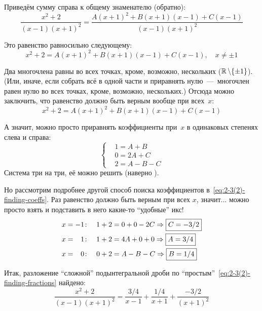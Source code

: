 \documentclass[a4paper,12pt]{article}
\begin{document}
\begin{solution}
    Приведём сумму справа к общему знаменателю (обратно):
    \[
      \frac{x^2 + 2}{(x - 1) (x + 1)^2} = \frac{A(x + 1)^2 + B(x + 1)(x - 1) + C(x - 1)}{(x - 1) (x + 1)^2}
    \]

    Это равенство равносильно следующему:
    \[
      x^2 + 2 = A(x + 1)^2 + B(x + 1)(x - 1) + C(x - 1),\quad x \not= \pm 1
    \]

    Два многочлена равны во всех точках, кроме, возможно, нескольких ($\RR \hm\setminus \{\pm 1\}$).
    (Или, иначе, если собрать всё в одной части и приравнять нулю~---~многочлен равен нулю во всех точках, кроме, возможно, нескольких.)
    Отсюда можно заключить, что равенство должно быть верным вообще при всех~$x$:
    \begin{equation}\label{eq:2-3(2)-finding-coeffs}
        x^2 + 2 = A(x + 1)^2 + B(x + 1)(x - 1) + C(x - 1)
    \end{equation}

    А значит, можно просто приравнять коэффициенты при~$x$ в одинаковых степенях слева и справа:
    \[
      \left\{
        \begin{aligned}
          &1 = A + B\\
          &0 = 2A + C\\
          &2 = A - B - C
        \end{aligned}
      \right.
    \]
    Система три на три, её можно решить (наверно%
    ).

    Но рассмотрим подробнее другой способ поиска коэффициентов в~\eqref{eq:2-3(2)-finding-coeffs}.
    Раз равенство должно быть верным при всех $x$, значит... можно просто взять и подставить в него какие-то ``удобные'' икс!
    \[
      \begin{aligned}
        &x = -1\colon\quad 1 + 2 = 0 + 0 - 2C \Rightarrow \boxed{C = -3/2}\\
        &x = \hphantom{-}1\colon\quad 1 + 2 = 4A + 0 + 0 \Rightarrow \boxed{A = 3/4}\\
        &x = \hphantom{-}0\colon\quad 0 + 2 = A - B - C \Rightarrow \boxed{B = 1/4}
      \end{aligned}
    \]

    Итак, разложение ``сложной'' подынтегральной дроби по ``простым''~\eqref{eq:2-3(2)-finding-fractions} найдено:
    \[
      \frac{x^2 + 2}{(x - 1) (x + 1)^2} = \frac{3/4}{x - 1} + \frac{1/4}{x + 1} + \frac{-3/2}{(x + 1)^2}
    \]


\end{solution}
\end{document}
